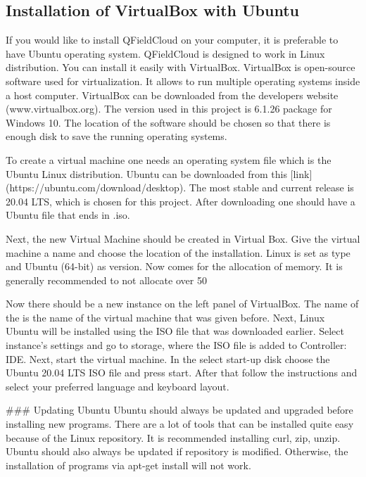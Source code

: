 \documentclass{article}
\begin{document}
\subsection{Installation of VirtualBox with Ubuntu}
\begin{markdown}
If you would like to install QFieldCloud on your computer, it is preferable to have Ubuntu operating system. QFieldCloud is designed to work in Linux distribution. You can install it easily with VirtualBox. VirtualBox is open-source software used for virtualization. It allows to run multiple operating systems inside a host computer. VirtualBox can be downloaded from the developers website (www.virtualbox.org). The version used in this project is 6.1.26 package for Windows 10. The location of the software should be chosen so that there is enough disk to save the running operating systems.

To create a virtual machine one needs an operating system file which is the Ubuntu Linux distribution. Ubuntu can be downloaded from this [link](https://ubuntu.com/download/desktop). The most stable and current release is 20.04 LTS, which is chosen for this project. After downloading one should have a Ubuntu file that ends in .iso.

Next, the new Virtual Machine should be created in Virtual Box. Give the virtual machine a name and choose the location of the installation. Linux is set as type and Ubuntu (64-bit) as version. Now comes for the allocation of memory. It is generally recommended to not allocate over 50 %

Now there should be a new instance on the left panel of VirtualBox. The name of the is the name of the virtual machine that was given before. Next, Linux Ubuntu will be installed using the ISO file that was downloaded earlier. Select instance’s settings and go to storage, where the ISO file is added to Controller: IDE. Next, start the virtual machine. In the select start-up disk choose the Ubuntu 20.04 LTS ISO file and press start. After that follow the instructions and select your preferred language and keyboard layout.

### Updating Ubuntu
Ubuntu should always be updated and upgraded before installing new programs. There are a lot of tools that can be installed quite easy because of the Linux repository. It is recommended installing curl, zip, unzip. Ubuntu should also always be updated if repository is modified. Otherwise, the installation of programs via apt-get install will not work.
\end{markdown}
\end{document}
